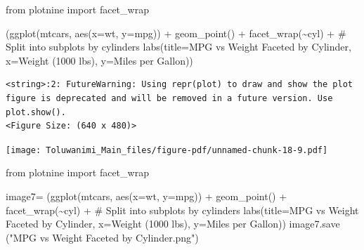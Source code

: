 \documentclass[
  letterpaper,
  DIV=11,
  numbers=noendperiod]{scrreprt}
\newenvironment{Shaded}{\begin{snugshade}}{\end{snugshade}}
\newcommand{\CommentTok}[1]{\textcolor[rgb]{0.37,0.37,0.37}{#1}}
\newcommand{\ImportTok}[1]{\textcolor[rgb]{0.00,0.46,0.62}{#1}}
\newcommand{\NormalTok}[1]{\textcolor[rgb]{0.00,0.23,0.31}{#1}}
\newcommand{\OperatorTok}[1]{\textcolor[rgb]{0.37,0.37,0.37}{#1}}
\newcommand{\StringTok}[1]{\textcolor[rgb]{0.13,0.47,0.30}{#1}}
\begin{document}
\begin{Shaded}
\begin{Highlighting}[]
\ImportTok{from}\NormalTok{ plotnine }\ImportTok{import}\NormalTok{ facet\_wrap}

\NormalTok{(ggplot(mtcars, aes(x}\OperatorTok{=}\StringTok{\textquotesingle{}wt\textquotesingle{}}\NormalTok{, y}\OperatorTok{=}\StringTok{\textquotesingle{}mpg\textquotesingle{}}\NormalTok{)) }\OperatorTok{+}
\NormalTok{ geom\_point() }\OperatorTok{+}
\NormalTok{ facet\_wrap(}\StringTok{\textquotesingle{}\textasciitilde{}cyl\textquotesingle{}}\NormalTok{) }\OperatorTok{+}  \CommentTok{\# Split into subplots by cylinders}
\NormalTok{ labs(title}\OperatorTok{=}\StringTok{\textquotesingle{}MPG vs Weight Faceted by Cylinder\textquotesingle{}}\NormalTok{,}
\NormalTok{      x}\OperatorTok{=}\StringTok{\textquotesingle{}Weight (1000 lbs)\textquotesingle{}}\NormalTok{,}
\NormalTok{      y}\OperatorTok{=}\StringTok{\textquotesingle{}Miles per Gallon\textquotesingle{}}\NormalTok{))}
\end{Highlighting}
\end{Shaded}

\begin{verbatim}
<string>:2: FutureWarning: Using repr(plot) to draw and show the plot figure is deprecated and will be removed in a future version. Use plot.show().
<Figure Size: (640 x 480)>
\end{verbatim}

\texttt{[image: Toluwanimi\_Main\_files/figure-pdf/unnamed-chunk-18-9.pdf]}

\begin{Shaded}
\begin{Highlighting}[]
\ImportTok{from}\NormalTok{ plotnine }\ImportTok{import}\NormalTok{ facet\_wrap}

\NormalTok{image7}\OperatorTok{=}\NormalTok{ (ggplot(mtcars, aes(x}\OperatorTok{=}\StringTok{\textquotesingle{}wt\textquotesingle{}}\NormalTok{, y}\OperatorTok{=}\StringTok{\textquotesingle{}mpg\textquotesingle{}}\NormalTok{)) }\OperatorTok{+}
\NormalTok{ geom\_point() }\OperatorTok{+}
\NormalTok{ facet\_wrap(}\StringTok{\textquotesingle{}\textasciitilde{}cyl\textquotesingle{}}\NormalTok{) }\OperatorTok{+}  \CommentTok{\# Split into subplots by cylinders}
\NormalTok{ labs(title}\OperatorTok{=}\StringTok{\textquotesingle{}MPG vs Weight Faceted by Cylinder\textquotesingle{}}\NormalTok{,}
\NormalTok{      x}\OperatorTok{=}\StringTok{\textquotesingle{}Weight (1000 lbs)\textquotesingle{}}\NormalTok{,}
\NormalTok{      y}\OperatorTok{=}\StringTok{\textquotesingle{}Miles per Gallon\textquotesingle{}}\NormalTok{))}
\NormalTok{image7.save (}\StringTok{"MPG vs Weight Faceted by Cylinder.png"}\NormalTok{)}
\end{Highlighting}
\end{Shaded}
\end{document}
